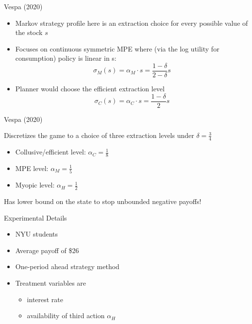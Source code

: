 \documentclass{beamer}
\begin{document}
\begin{frame}{Vespa (2020) }
\begin{card}
	\begin{itemize}
		\item Markov strategy profile here is an extraction choice for every possible value of the stock $s$
		\item Focuses on continuous symmetric MPE where (via the log utility for consumption) policy is linear in s:
		$$ \sigma_M(s)=\alpha_M \cdot s=\frac{1-\delta}{2-\delta}s $$
		\item Planner would choose the efficient extraction level
		$$\sigma_C(s)=\alpha_C \cdot s=\frac{1-\delta}{2}s$$
	\end{itemize}
	\end{card}
\end{frame}

\begin{frame}{Vespa (2020) }
	\begin{card}
    Discretizes the game to a choice of three extraction levels under $\delta=\tfrac{3}{4}$
		\begin{itemize}
			\item Collusive/efficient level: $\alpha_C= \tfrac{1}{8}$
			\item MPE level: $\alpha_M= \tfrac{1}{5}$
			\item Myopic level: $\alpha_H= \tfrac{1}{2}$
		\end{itemize}
Has lower bound on the state to stop unbounded negative payoffs!
		\end{card}
\end{frame}


\begin{frame}
    \begin{card}{Experimental Details}
    	\begin{itemize}
    		\item NYU students
    		\item Average payoff of \$26
    		\item One-period ahead strategy method
    		\item Treatment variables are
    		\begin{itemize}
    			\item interest rate
    			\item availability of third action $\alpha_H$
    		\end{itemize}
    	\end{itemize}
    \end{card}
\end{frame}
\end{document}
